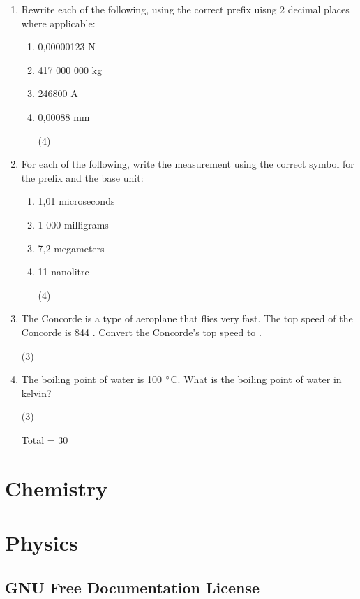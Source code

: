 \documentclass[10pt,a4paper,titlepage,twoside,openright]{report}
\begin{document}
\begin{enumerate}
\item{Rewrite each of the following, using the correct prefix uisng 2 decimal places where applicable:
\begin{enumerate}
\item{0,00000123 N}
\item{417 000 000 kg}
\item{246800 A}
\item{0,00088 mm}
\begin{flushright}
(4)
\end{flushright}
\end {enumerate}}

\item{For each of the following, write the measurement using the correct symbol for the prefix and the base unit:
\begin{enumerate}
\item{1,01 microseconds}
\item{1 000 milligrams}
\item{7,2 megameters}
\item{11 nanolitre}
\begin{flushright}
(4)
\end{flushright}
\end{enumerate}}

\item{The Concorde is a type of aeroplane that flies very fast. The top speed of the Concorde is 844 \kph. Convert the Concorde's top speed to \ms.}
\begin{flushright}
(3)
\end{flushright}

\item{The boiling point of water is 100 $^{\circ}$C. What is the boiling point of water in kelvin?}
\begin{flushright}
(3)
\end{flushright}
\begin{flushright}
Total = 30
\end{flushright}
\end{enumerate}
\part{Chemistry}

\part{Physics}



\appendix
\chapter{GNU Free Documentation License}\label{fdl}
\end{document}
